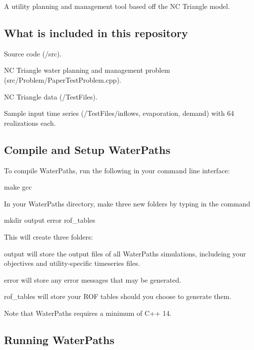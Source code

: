 A utility planning and management tool based off the NC Triangle model.

\subsection*{What is included in this repository}


\begin{DoxyItemize}
\item Source code ({\ttfamily /src}).
\item NC Triangle water planning and management problem ({\ttfamily src/\+Problem/\+Paper\+Test\+Problem.\+cpp}).
\item NC Triangle data ({\ttfamily /\+Test\+Files}).
\item Sample input time series ({\ttfamily /\+Test\+Files/inflows}, {\ttfamily evaporation}, {\ttfamily demand}) with 64 realizations each.
\end{DoxyItemize}

\subsection*{Compile and Setup Water\+Paths}

To compile Water\+Paths, run the following in your command line interface\+: 
\begin{DoxyCode}
make gcc
\end{DoxyCode}


In your Water\+Paths directory, make three new folders by typing in the command 
\begin{DoxyCode}
mkdir output error rof\_tables
\end{DoxyCode}


This will create three folders\+:
\begin{DoxyItemize}
\item {\ttfamily output} will store the output files of all Water\+Paths simulations, includeing your objectives and utility-\/specific timeseries files.
\item {\ttfamily error} will store any error messages that may be generated.
\item {\ttfamily rof\+\_\+tables} will store your R\+OF tables should you choose to generate them.
\end{DoxyItemize}

Note that Water\+Paths requires a minimum of C++ 14.

\subsection*{Running Water\+Paths}

